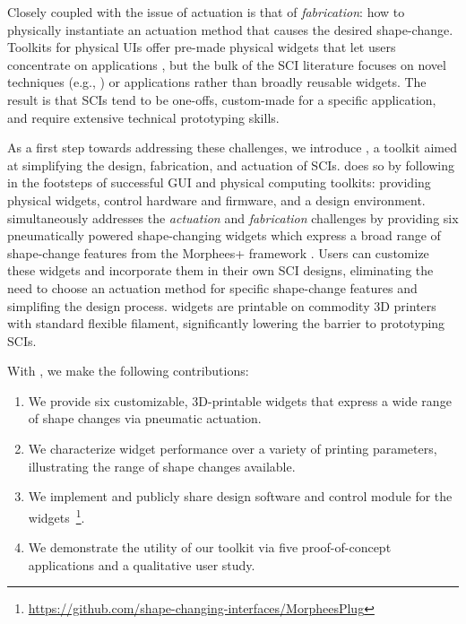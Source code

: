     Closely coupled with the issue of actuation is that of
    \textit{fabrication}: how to physically instantiate an actuation method
    that causes the desired shape-change. Toolkits for physical UIs offer
    pre-made physical widgets that let users concentrate on applications
    \cite{Greenberg:2001,Bdeir:2009kz}, but the bulk of the SCI literature
    focuses on novel techniques (e.g., \cite{10.1145/2984511.2984520}) or
    applications rather than broadly reusable widgets. The result is that SCIs
    tend to be one-offs, custom-made for a specific application, and require
    extensive technical prototyping skills.
  
    As a first step towards addressing these challenges, we introduce \mp, a
    toolkit aimed at simplifying the design, fabrication, and actuation of
    SCIs. \mp does so by following in the footsteps of successful GUI
    and physical computing toolkits: providing physical widgets, control
    hardware and firmware, and a design environment. \mp simultaneously
    addresses the \textit{actuation} and \textit{fabrication} challenges by
    providing six pneumatically powered shape-changing widgets which express a
    broad range of shape-change features from the Morphees+ framework
    \cite{10.1145/3173574.3174193}. Users can customize these widgets and
    incorporate them in their own SCI designs, eliminating the need to choose
    an actuation method for specific shape-change features and simplifing the
    design process. \mp widgets are printable on commodity 3D printers with
    standard flexible filament, significantly lowering the barrier to
    prototyping SCIs. 

    With \mp, we make the following contributions:     
      \begin{enumerate}
        \item We provide six customizable, 3D-printable widgets that express
          a wide range of shape changes via pneumatic actuation.
        \item We characterize widget performance over a variety of printing
          parameters, illustrating the range of shape changes available.
        \item We implement and publicly share design software and control
          module for the
          widgets~\footnote{\url{https://github.com/shape-changing-interfaces/MorpheesPlug}}.
        \item We demonstrate the utility of our toolkit via five
          proof-of-concept applications and a qualitative user study.
      \end{enumerate}

